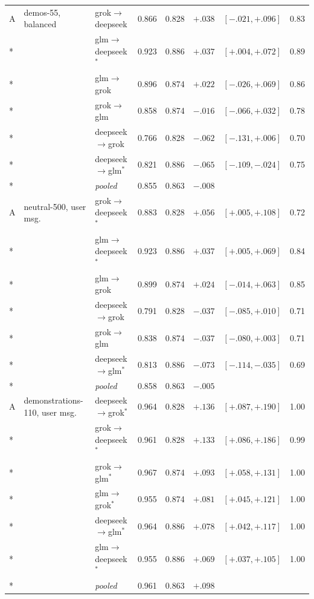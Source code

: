 {\begin{longtable}{lllrlrrr}
\addlinespace
A & demos-55, balanced & grok$\to$deepseek & 0.866 & 0.828 & $+.038$ & $[-.021,+.096]$ & 0.83 \\*
 &  & glm$\to$deepseek$^{*}$ & 0.923 & 0.886 & $+.037$ & $[+.004,+.072]$ & 0.89 \\*
 &  & glm$\to$grok & 0.896 & 0.874 & $+.022$ & $[-.026,+.069]$ & 0.86 \\*
 &  & grok$\to$glm & 0.858 & 0.874 & $-.016$ & $[-.066,+.032]$ & 0.78 \\*
 &  & deepseek$\to$grok & 0.766 & 0.828 & $-.062$ & $[-.131,+.006]$ & 0.70 \\*
 &  & deepseek$\to$glm$^{*}$ & 0.821 & 0.886 & $-.065$ & $[-.109,-.024]$ & 0.75 \\*
 & & \emph{pooled} & 0.855 & 0.863 & $-.008$ & & \\
\addlinespace
A & neutral-500, user msg. & grok$\to$deepseek$^{*}$ & 0.883 & 0.828 & $+.056$ & $[+.005,+.108]$ & 0.72 \\*
 &  & glm$\to$deepseek$^{*}$ & 0.923 & 0.886 & $+.037$ & $[+.005,+.069]$ & 0.84 \\*
 &  & glm$\to$grok & 0.899 & 0.874 & $+.024$ & $[-.014,+.063]$ & 0.85 \\*
 &  & deepseek$\to$grok & 0.791 & 0.828 & $-.037$ & $[-.085,+.010]$ & 0.71 \\*
 &  & grok$\to$glm & 0.838 & 0.874 & $-.037$ & $[-.080,+.003]$ & 0.71 \\*
 &  & deepseek$\to$glm$^{*}$ & 0.813 & 0.886 & $-.073$ & $[-.114,-.035]$ & 0.69 \\*
 & & \emph{pooled} & 0.858 & 0.863 & $-.005$ & & \\
\addlinespace
A & demonstrations-110, user msg. & deepseek$\to$grok$^{*}$ & 0.964 & 0.828 & $+.136$ & $[+.087,+.190]$ & 1.00 \\*
 &  & grok$\to$deepseek$^{*}$ & 0.961 & 0.828 & $+.133$ & $[+.086,+.186]$ & 0.99 \\*
 &  & grok$\to$glm$^{*}$ & 0.967 & 0.874 & $+.093$ & $[+.058,+.131]$ & 1.00 \\*
 &  & glm$\to$grok$^{*}$ & 0.955 & 0.874 & $+.081$ & $[+.045,+.121]$ & 1.00 \\*
 &  & deepseek$\to$glm$^{*}$ & 0.964 & 0.886 & $+.078$ & $[+.042,+.117]$ & 1.00 \\*
 &  & glm$\to$deepseek$^{*}$ & 0.955 & 0.886 & $+.069$ & $[+.037,+.105]$ & 1.00 \\*
 & & \emph{pooled} & 0.961 & 0.863 & $+.098$ & & \\
\end{longtable}}
